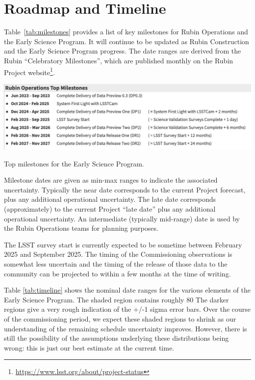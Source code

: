\section{Roadmap and Timeline} \label{sec:timeline}

Table~\ref{tab:milestones} provides a list of key milestones for Rubin Operations and the Early Science Program.
It will continue to be updated as Rubin Construction and the Early Science Program progress. 
The date ranges are derived from the Rubin ``Celebratory Milestones'', which are  published monthly on the Rubin Project website\footnote{\url{https://www.lsst.org/about/project-status}}. 

\begin{table}[ht]
\centering
\includegraphics[width=\linewidth]{figures/DPR-milestones}
\caption{Top milestones for the Early Science Program.}
\label{tab:milestones}
\end{table}

Milestone dates are given as min-max ranges to indicate the associated uncertainty. 
Typically the near date corresponds to the current Project forecast, plus any additional operational uncertainty.
The late date corresponds (approximately) to the current Project ``late date'' plus any additional operational uncertainty.
An intermediate (typically mid-range) date is used by the Rubin Operations teams for planning purposes. 

The LSST survey start is currently expected to be sometime between February 2025 and September 2025.
The timing of the Commissioning observations is somewhat less uncertain and the timing of the release of those data to the community can be projected to within a few months at the time of writing.

Table \ref{tab:timeline} shows the nominal date ranges for the various elements of the Early Science Program. 
The shaded region contains roughly 80%
The darker regions give a very rough indication of the +/-1 sigma error bars. 
Over the course of the commissioning period, we expect these shaded regions to shrink as our understanding of the remaining schedule uncertainty improves. 
However, there is still the possibility of the assumptions underlying these distributions being wrong: this is just our best estimate at the current time.

